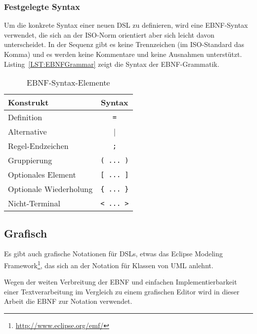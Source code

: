 \documentclass[../InterneDSLs.tex]{subfiles}
\begin{document}
\subsubsection{Festgelegte Syntax}
Um die konkrete Syntax einer neuen DSL zu definieren, wird eine EBNF-Syntax verwendet, die sich an der ISO-Norm orientiert aber sich leicht davon unterscheidet. In der Sequenz gibt es keine Trennzeichen (im ISO-Standard das Komma) und es werden keine Kommentare und keine Ausnahmen unterstützt. Listing~\ref{LST:EBNFGrammar} zeigt die Syntax der EBNF-Grammatik.

\begin{figure}[ht]

\end{figure}

\begin{table}[ht]
\centering
\begin{tabular}{l|c}
\textbf{Konstrukt}     & \textbf{Syntax}\\\hline
Definition             & \verb|=|\\
Alternative            & |\\
Regel-Endzeichen       & \verb|;|\\
Gruppierung            & \verb|( ... )|\\
Optionales Element     & \verb|[ ... ]|\\
Optionale Wiederholung & \verb|{ ... }|\\
Nicht-Terminal         & \verb|< ... >|\\
\end{tabular}
\caption{EBNF-Syntax-Elemente}
\label{TAB:EBNFSyntax}
\end{table}


\subsection{Grafisch}
Es gibt auch grafische Notationen für DSLs, etwas das Eclipse Modeling Framework\footnote{\url{http://www.eclipse.org/emf/}}, das sich an der Notation für Klassen von UML anlehnt.

Wegen der weiten Verbreitung der EBNF und einfachen Implementierbarkeit einer Textverarbeitung im Vergleich zu einem grafischen Editor wird in dieser Arbeit die EBNF zur Notation verwendet.
\end{document}
